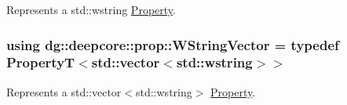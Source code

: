 Represents a {\ttfamily std\+::wstring} \hyperlink{classdg_1_1deepcore_1_1_property}{Property}. 

\subsubsection[{\texorpdfstring{W\+String\+Vector}{WStringVector}}]{\setlength{\rightskip}{0pt plus 5cm}using {\bf dg\+::deepcore\+::prop\+::\+W\+String\+Vector} = typedef PropertyT$<$std\+::vector$<$std\+::wstring$>$$>$}\hypertarget{group___process_properties_gaace0f946c7fa66d4294f15b240a3bb1a}{}\label{group___process_properties_gaace0f946c7fa66d4294f15b240a3bb1a}


Represents a {\ttfamily std\+::vector$<$std\+::wstring$>$} \hyperlink{classdg_1_1deepcore_1_1_property}{Property}. 

